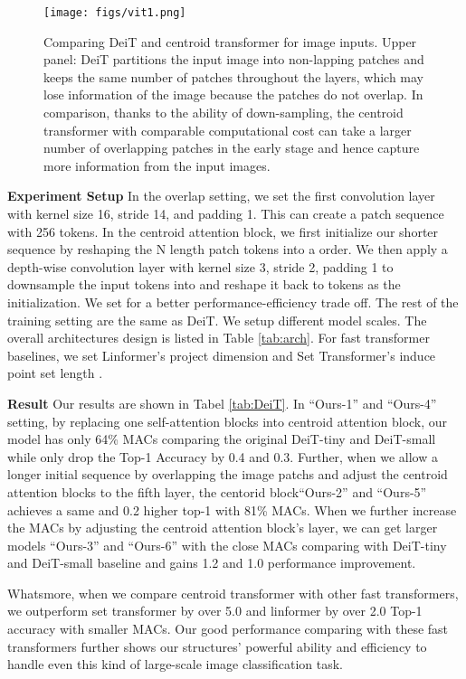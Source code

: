 \documentclass[english]{article}
\begin{document}
\begin{figure}
    \centering
    \texttt{[image: figs/vit1.png]}
    \caption{Comparing DeiT and centroid transformer for image inputs. 
    Upper panel: DeiT partitions the input image into non-lapping patches and keeps the same number of patches throughout the layers, which may lose information of the image because the  patches do not overlap. 
    In comparison,  thanks to the ability of down-sampling, the centroid transformer with comparable computational cost can take a larger number of overlapping patches in the early stage and hence capture more information from the input images.
    }
\label{fig:arch}
 
\end{figure}
\textbf{Experiment Setup} \space In the overlap setting, we set the first convolution layer with kernel size 16, stride 14, and padding 1. This can create a patch sequence with 256 tokens. In the centroid attention block, we first initialize our shorter sequence by reshaping the N length patch tokens into a  order. We then apply a depth-wise convolution layer with kernel size 3, stride 2, padding 1 to downsample the input tokens into  and reshape it back to  tokens as the initialization. We set  for a better performance-efficiency trade off. The rest of the training setting are the same as DeiT. We setup different model scales. The overall architectures design is listed in Table \ref{tab:arch}. For fast transformer baselines, we set Linformer's project dimension  and Set Transformer's induce point set length .

\textbf{Result} \space Our results are shown in Tabel \ref{tab:DeiT}. In ``Ours-1'' and ``Ours-4'' setting, by replacing one self-attention blocks into centroid attention block, our model has only 64\% MACs comparing the original DeiT-tiny and DeiT-small while only drop the Top-1 Accuracy by 0.4 and 0.3.  Further, when we allow a longer initial sequence by overlapping the image patchs and adjust the centroid attention blocks to the fifth layer, the centorid block``Ours-2'' and ``Ours-5'' achieves a same and 0.2 higher top-1 with 81\% MACs.
When we further increase the MACs by adjusting the centroid attention block's layer, we can get larger models ``Ours-3'' and ``Ours-6'' with the close MACs comparing with DeiT-tiny and DeiT-small baseline and gains 1.2 and 1.0 performance improvement.

Whatsmore, when we compare centroid transformer with other fast transformers, we outperform set transformer by over 5.0 and linformer by over 2.0 Top-1 accuracy with smaller MACs. Our good performance comparing with these fast transformers further shows our structures' powerful ability and efficiency to handle even this kind of large-scale image classification task.
\end{document}
